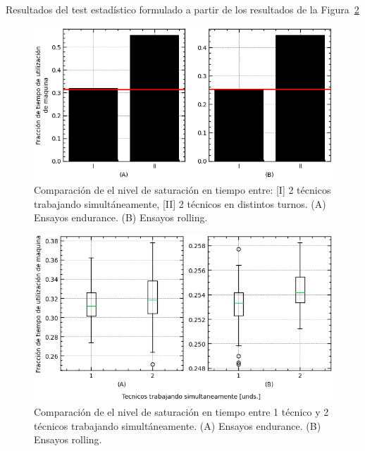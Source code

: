 \begin{table}
	\centering
	\caption{Resultados del test estadístico formulado a partir de los resultados de la Figura~\ref{fig:4_box_techn1-2_comp}}
	
	\label{tab:4_tbl_studet-t}
\end{table}

\begin{figure}
	\begin{center}
		\includegraphics[width=\textwidth]{fig/4_bar_2shift-2techn_comp}
	\end{center}
	\caption{Comparación de el nivel de saturación en tiempo entre: [I] 2 técnicos trabajando simultáneamente, [II] 2 técnicos en distintos turnos.
	(A) Ensayos endurance. (B) Ensayos rolling.}
	\label{fig:4_bar_2shift-2techn_comp}
\end{figure}

\begin{figure}
	\begin{center}
		\includegraphics[width=\textwidth]{fig/4_box_techn1-2_comp}
	\end{center}
	\caption{Comparación de el nivel de saturación en tiempo entre 1 técnico y 2 técnicos trabajando simultáneamente.
	(A) Ensayos endurance. (B) Ensayos rolling.}
	\label{fig:4_box_techn1-2_comp}
\end{figure}

